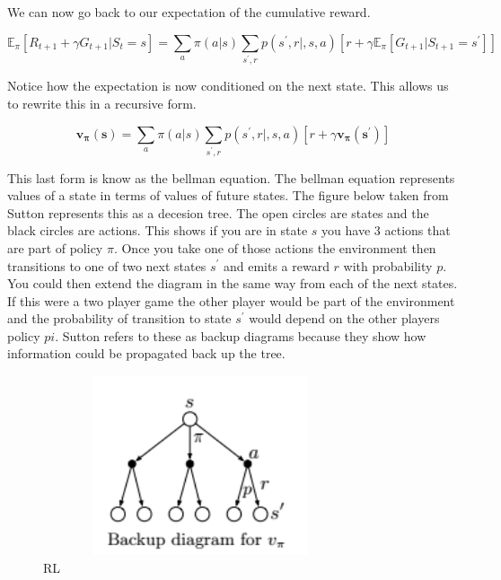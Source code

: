 We can now go back to our expectation of the cumulative reward. 

$$\mathbb{E}_{\pi}[R_{t + 1} + \gamma G_{t + 1} | S_{t} = s] = \underset{a}{\sum}\pi(a|s)\underset{s^{'},r}{\sum}p(s^{'},r|,s,a)[ r + \gamma \mathbb{E}_{\pi}[G_{t + 1} | S_{t + 1} = s^{'}]] $$

Notice how the expectation is now conditioned on the next state. This allows us to rewrite this in a recursive form.

\begin{equation}\label{Bellman State Value Equation}
\mathbf{v_{\pi}(s)} = \underset{a}{\sum}\pi(a|s)\underset{s^{'},r}{\sum}p(s^{'},r|,s,a)[ r + \gamma \mathbf{v_{\pi}(s^{'})}]
\end{equation}

This last form is know as the bellman equation. The bellman equation represents values of a state in terms of values of future states. The figure below taken from Sutton represents this as a decesion tree. The open circles are states and the black circles are actions. This shows if you are in state $s$ you have 3 actions that are part of policy $\pi$. Once you take one of those actions the environment then transitions to one of two next states $s^{'}$ and emits a reward $r$ with probability $p$. You could then extend the diagram in the same way from each of the next states. If this were a two player game the other player would be part of the environment and the probability of transition to state $s^{'}$ would depend on the other players policy $pi$. Sutton refers to these as backup diagrams because they show how information could be propagated back up the tree. 

\begin{figure}[h!]
        \centering
        \includegraphics[width=350px,height=200px]{images/bellman_update.png}
        \caption{RL}
        \label{fig:my_label}
\end{figure}

